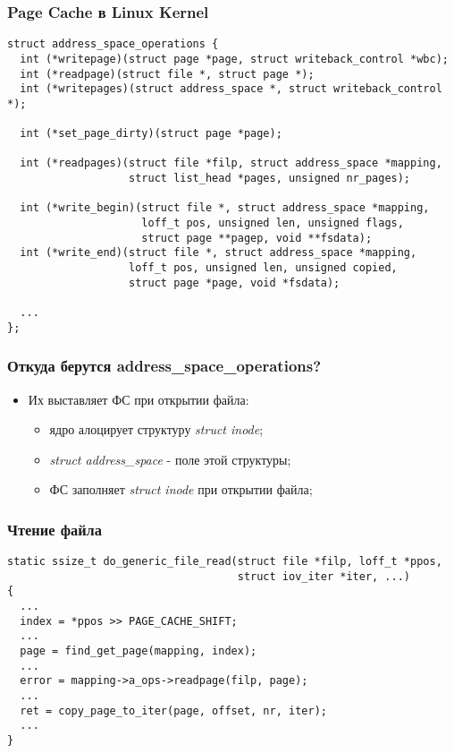 \begin{frame}[fragile]
\frametitle{Page Cache в Linux Kernel}
\begin{lstlisting}
struct address_space_operations {
  int (*writepage)(struct page *page, struct writeback_control *wbc);
  int (*readpage)(struct file *, struct page *);
  int (*writepages)(struct address_space *, struct writeback_control *);

  int (*set_page_dirty)(struct page *page);

  int (*readpages)(struct file *filp, struct address_space *mapping,
                   struct list_head *pages, unsigned nr_pages);

  int (*write_begin)(struct file *, struct address_space *mapping,
                     loff_t pos, unsigned len, unsigned flags,
                     struct page **pagep, void **fsdata);
  int (*write_end)(struct file *, struct address_space *mapping,
                   loff_t pos, unsigned len, unsigned copied,
                   struct page *page, void *fsdata);

  ...
};
\end{lstlisting}
\end{frame}

\begin{frame}
\frametitle{Откуда берутся address\_space\_operations?}
\begin{itemize}
  \item Их выставляет ФС при открытии файла:
    \begin{itemize}
      \item ядро алоцирует структуру \emph{struct inode};
      \item \emph{struct address\_space} - поле этой структуры;
      \item ФС заполняет \emph{struct inode} при открытии файла;
   \end{itemize}
\end{itemize}
\end{frame}

\begin{frame}[fragile]
\frametitle{Чтение файла}
\begin{lstlisting}
static ssize_t do_generic_file_read(struct file *filp, loff_t *ppos,
                                    struct iov_iter *iter, ...)
{
  ...
  index = *ppos >> PAGE_CACHE_SHIFT;
  ...
  page = find_get_page(mapping, index);
  ...
  error = mapping->a_ops->readpage(filp, page);
  ...
  ret = copy_page_to_iter(page, offset, nr, iter);
  ...
}
\end{lstlisting}
\end{frame}

